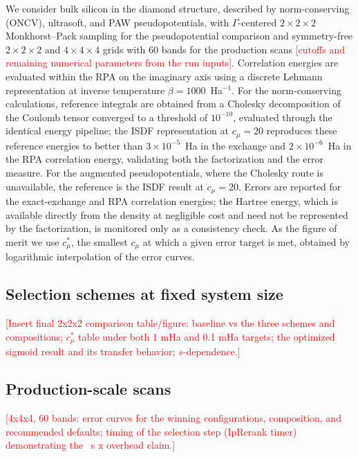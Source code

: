 \documentclass[aps,prb,twocolumn,superscriptaddress,amsmath,amssymb]{revtex4-2}
\newcommand{\cmu}{c_\mu}
\newcommand{\todo}[1]{\textcolor{red}{[#1]}}
\begin{document}
We consider bulk silicon in the diamond structure, described by
norm-conserving (ONCV), ultrasoft, and PAW pseudopotentials, with
$\Gamma$-centered $2\times2\times2$ Monkhorst--Pack sampling for the
pseudopotential comparison and symmetry-free $2\times2\times2$ and
$4\times4\times4$ grids with 60 bands for the production scans
\todo{cutoffs and remaining numerical parameters from the run inputs}.
Correlation energies are evaluated within the RPA on the imaginary axis
using a discrete Lehmann representation at inverse temperature
$\beta = 1000$~Ha$^{-1}$. For the norm-conserving calculations, reference
integrals are obtained from a Cholesky decomposition of the Coulomb tensor
converged to a threshold of $10^{-10}$, evaluated through the identical
energy pipeline; the ISDF representation at $\cmu = 20$ reproduces these
reference energies to better than $3\times10^{-5}$~Ha in the exchange and
$2\times10^{-6}$~Ha in the RPA correlation energy, validating both the
factorization and the error measure. For the augmented pseudopotentials,
where the Cholesky route is unavailable, the reference is the ISDF result
at $\cmu = 20$. Errors are reported for the exact-exchange and RPA
correlation energies; the Hartree energy, which is available directly from
the density at negligible cost and need not be represented by the
factorization, is monitored only as a consistency check. As the figure of
merit we use $\cmu^{*}$, the smallest $\cmu$ at which a given error target
is met, obtained by logarithmic interpolation of the error curves.

\subsection{Selection schemes at fixed system size}
\label{sec:results222}

\todo{Insert final 2x2x2 comparison table/figure: baseline vs the three
schemes and compositions; $\cmu^{*}$ table under both 1 mHa and 0.1 mHa
targets; the optimized sigmoid result and its transfer behavior;
$s$-dependence.}

\subsection{Production-scale scans}
\label{sec:results444}

\todo{4x4x4, 60 bands: error curves for the winning configurations,
composition, and recommended defaults; timing of the selection step
(IpRerank timer) demonstrating the ~s x overhead claim.}
\end{document}
